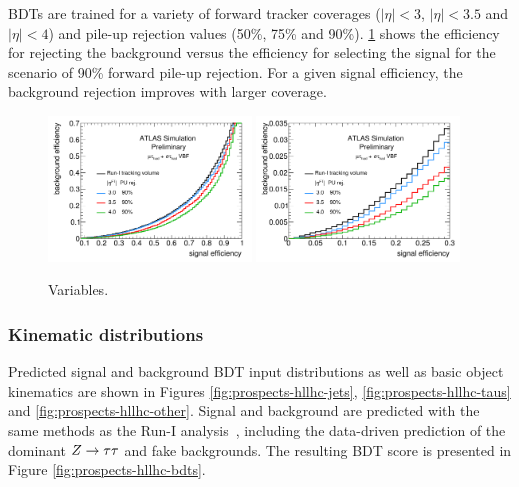 BDTs are trained for a variety of forward tracker coverages ($|\eta| < 3$, $|\eta| < 3.5$ and $|\eta| < 4$) and pile-up rejection values (50\%, 75\% and 90\%). \cref{fig:prospects-hllhc-rocs} shows the efficiency for rejecting the background versus the efficiency for selecting the signal for the scenario of 90\% forward pile-up rejection. For a given signal efficiency, the background rejection improves with larger coverage.

\begin{figure}[!htpb]
  \centering
  \includegraphics[width=0.48\textwidth]{figures/ATL-PHYS-PUB-2014-018/fig_02a}
  \includegraphics[width=0.48\textwidth]{figures/ATL-PHYS-PUB-2014-018/fig_02b}
  \caption{Variables.}
  \label{fig:prospects-hllhc-rocs}
\end{figure}

\subsubsection{Kinematic distributions}

Predicted signal and background BDT input distributions as well as basic object kinematics are shown in Figures \cref{fig:prospects-hllhc-jets}, \cref{fig:prospects-hllhc-taus} and \cref{fig:prospects-hllhc-other}. Signal and background are predicted with the same methods as the Run-I analysis~\cite{HIGG-2013-32}, including the data-driven prediction of the dominant $Z\rightarrow\tau\tau$ and fake backgrounds. The resulting BDT score is presented in Figure \cref{fig:prospects-hllhc-bdts}.

